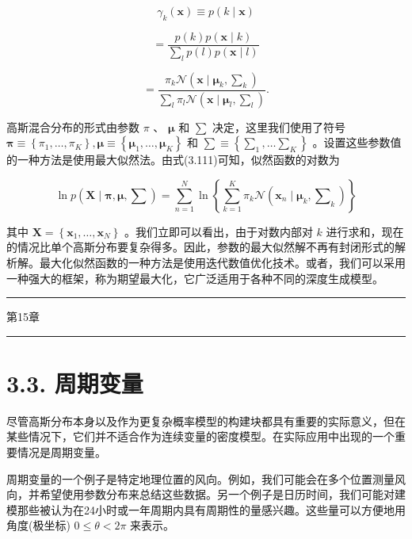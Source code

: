 \documentclass[10pt]{article}
\newcommand{\HRule}{\begin{center}\rule{0.9\linewidth}{0.2mm}\end{center}}
\begin{document}
\[
{\gamma }_{k}\left( \mathbf{x}\right)  \equiv  p\left( {k \mid  \mathbf{x}}\right)
\]

\[
= \frac{p\left( k\right) p\left( {\mathbf{x} \mid  k}\right) }{\mathop{\sum }\limits_{l}p\left( l\right) p\left( {\mathbf{x} \mid  l}\right) }
\]

\[
= \frac{{\pi }_{k}\mathcal{N}\left( {\mathbf{x} \mid  {\mathbf{\mu }}_{k},{\mathbf{\sum }}_{k}}\right) }{\mathop{\sum }\limits_{l}{\pi }_{l}\mathcal{N}\left( {\mathbf{x} \mid  {\mathbf{\mu }}_{l},{\mathbf{\sum }}_{l}}\right) }. \tag{3.115}
\]

高斯混合分布的形式由参数 \(\pi\) 、 \(\mathbf{\mu }\) 和 \(\mathbf{\sum }\) 决定，这里我们使用了符号 \(\mathbf{\pi } \equiv  \left\{  {{\pi }_{1},\ldots ,{\pi }_{K}}\right\}  ,\mathbf{\mu } \equiv  \left\{  {{\mathbf{\mu }}_{1},\ldots ,{\mathbf{\mu }}_{K}}\right\}\) 和 \(\mathbf{\sum } \equiv  \left\{  {{\mathbf{\sum }}_{1},\ldots {\mathbf{\sum }}_{K}}\right\}\) 。设置这些参数值的一种方法是使用最大似然法。由式(3.111)可知，似然函数的对数为

\[
\ln p\left( {\mathbf{X} \mid  \mathbf{\pi },\mathbf{\mu },\mathbf{\sum }}\right)  = \mathop{\sum }\limits_{{n = 1}}^{N}\ln \left\{  {\mathop{\sum }\limits_{{k = 1}}^{K}{\pi }_{k}\mathcal{N}\left( {{\mathbf{x}}_{n} \mid  {\mathbf{\mu }}_{k},{\mathbf{\sum }}_{k}}\right) }\right\}   \tag{3.116}
\]

其中 \(\mathbf{X} = \left\{  {{\mathbf{x}}_{1},\ldots ,{\mathbf{x}}_{N}}\right\}\) 。我们立即可以看出，由于对数内部对 \(k\) 进行求和，现在的情况比单个高斯分布要复杂得多。因此，参数的最大似然解不再有封闭形式的解析解。最大化似然函数的一种方法是使用迭代数值优化技术。或者，我们可以采用一种强大的框架，称为期望最大化，它广泛适用于各种不同的深度生成模型。

\HRule

第15章

\HRule

\section*{3.3. 周期变量}

尽管高斯分布本身以及作为更复杂概率模型的构建块都具有重要的实际意义，但在某些情况下，它们并不适合作为连续变量的密度模型。在实际应用中出现的一个重要情况是周期变量。

周期变量的一个例子是特定地理位置的风向。例如，我们可能会在多个位置测量风向，并希望使用参数分布来总结这些数据。另一个例子是日历时间，我们可能对建模那些被认为在24小时或一年周期内具有周期性的量感兴趣。这些量可以方便地用角度(极坐标) \(0 \leq  \theta  < {2\pi }\) 来表示。
\end{document}
